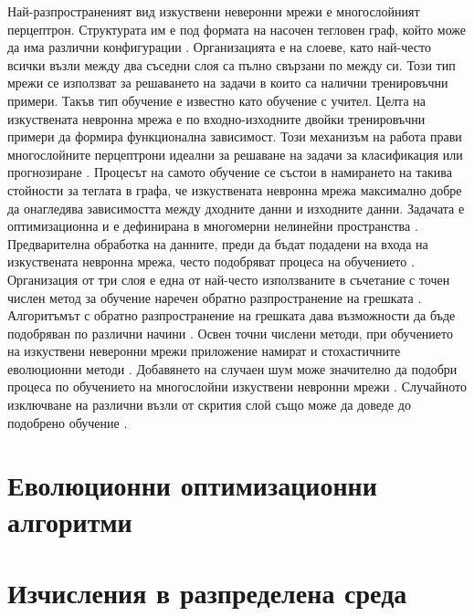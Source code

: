 Най-разпространеният вид изкуствени неверонни мрежи е многослойният перцептрон. Структурата им е под формата на насочен тегловен граф, който може да има различни конфигурации \cite{da-Silva-01}. Организацията е на слоеве, като най-често всички възли между два съседни слоя са пълно свързани по между си. Този тип мрежи се използват за решаването на задачи в които са налични тренировъчни примери. Такъв тип обучение е известно като обучение с учител. Целта на изкуствената невронна мрежа е по входно-изходните двойки тренировъчни примери да формира функционална зависимост. Този механизъм на работа прави многослойните перцептрони идеални за решаване на задачи за класификация \cite{Kubat-01} или прогнозиране \cite{Basheer-01}. Процесът на самото обучение се състои в намирането на такива стойности за теглата в графа, че изкуствената невронна мрежа максимално добре да онагледява зависимостта между дходните данни и изходните данни. Задачата е оптимизационна и е дефинирана в многомерни нелинейни пространства \cite{Kingston-01}. Предварителна обработка на данните, преди да бъдат подадени на входа на изкуствената невронна мрежа, често подобряват процеса на обучението \cite{Nawi-01}. Организация от три слоя е една от най-често използваните в съчетание с точен числен метод за обучение наречен обратно разпространение на грешката \cite{Pomerleau-01}. Алгоритъмът с обратно разпространение на грешката дава възможности да бъде подобряван по различни начини \cite{Kollias-01}. Освен точни числени методи, при обучението на изкуствени неверонни мрежи приложение намират и стохастичните еволюционни методи \cite{Slowik-01}. Добавянето на случаен шум може значително да подобри процеса по обучението на многослойни изкуствени невронни мрежи \cite{Sietsma-01}. Случайното изключване на различни възли от скрития слой също може да доведе до подобрено обучение \cite{Sequin-01}.

\section{Еволюционни оптимизационни алгоритми}

\section{Изчисления в разпределена среда}


